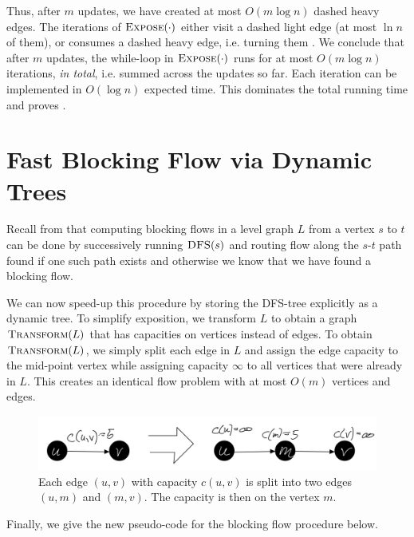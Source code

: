 Thus, after $m$ updates, we have created at most $O(m \log n)$ dashed heavy edges. The iterations of $\textsc{Expose}(\cdot)$ either visit a dashed light edge (at most $\ln n$ of them), or consumes a dashed heavy edge, i.e. turning them .
We conclude that after $m$ updates, the while-loop in $\textsc{Expose}(\cdot)$ runs for at most $O(m \log n)$ iterations, \emph{in total}, i.e. summed across the updates so far. Each iteration can be implemented in $O(\log n)$ expected time. This dominates the total running time and proves .

\section{Fast Blocking Flow via Dynamic Trees}

Recall from  that computing blocking flows in a level graph $L$ from a vertex $s$ to $t$ can be done by successively running $\textsc{DFS}(s)$ and routing flow along the $s$-$t$ path found if one such path exists and otherwise we know that we have found a blocking flow. 

We can now speed-up this procedure by storing the DFS-tree explicitly as a dynamic tree. To simplify exposition, we transform $L$ to obtain a graph $\textsc{Transform}(L)$ that has capacities on vertices instead of edges. To obtain $\textsc{Transform}(L)$, we simply split each edge in $L$ and assign the edge capacity to the mid-point vertex while assigning capacity $\infty$ to all vertices that were already in $L$. This creates an identical flow problem with at most $O(m)$ vertices and edges.

\begin{figure}[!ht]
    \centering
    \includegraphics[scale=0.2]{./fig/TransformToVertCaps_lectureDynamicTree.jpeg}
    \caption{Each edge $(u,v)$ with capacity $c(u,v)$ is split into two edges $(u,m)$ and $(m,v)$. The capacity is then on the vertex $m$.}
    \label{fig:my_label}
\end{figure}

Finally, we give the new pseudo-code for the blocking flow procedure below.

